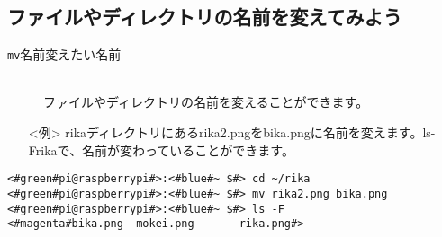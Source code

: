 \newpage
\subsection{ファイルやディレクトリの名前を変えてみよう}
\begin{description}
\item[\texttt{mv}\textvisiblespace 名前\textvisiblespace 変えたい名前]\mbox{}\\
ファイルやディレクトリの名前を変えることができます。
\end{description}
\begin{itemize}
\item[<例>]rikaディレクトリにあるrika2.pngをbika.pngに名前を変えます。ls\textvisiblespace -F\textvisiblespace rikaで、名前が変わっていることができます。
\end{itemize}
\begin{lstlisting}[caption=mvNameの例, label=mvName]
<#green#pi@raspberrypi#>:<#blue#~ $#> cd ~/rika
<#green#pi@raspberrypi#>:<#blue#~ $#> mv rika2.png bika.png
<#green#pi@raspberrypi#>:<#blue#~ $#> ls -F
<#magenta#bika.png	mokei.png		rika.png#>
\end{lstlisting}

\begin{tcolorbox}[title=\useOmetoi]
\begin{enumerate}
\end{enumerate}
\end{tcolorbox}
